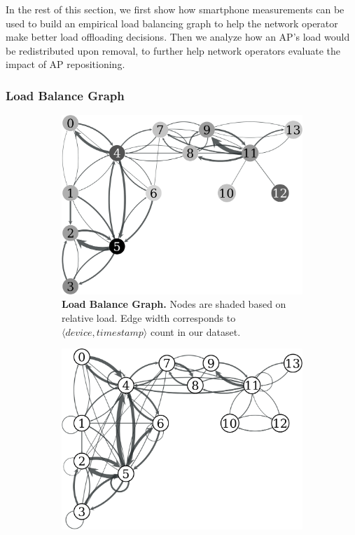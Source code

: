 In the rest of this section, we first show how smartphone measurements can be
used to build an empirical load balancing graph to help the network operator
make better load offloading decisions. Then we analyze how an AP's load would be
redistributed upon removal, to further help network operators evaluate the
impact of AP repositioning.


\subsubsection{Load Balance Graph}
\label{subsec:load_balance}

\begin{figure}
  \centering
  \begin{subfigure}[b]{0.3\textwidth}
    \includegraphics[width=\columnwidth]{./figures/DavisLoadBalanceGraph.pdf}
    \caption{\textbf{Load Balance Graph.} Nodes are shaded based on 
      relative load. Edge width corresponds to $\langle device, timestamp \rangle$
    count in our dataset.}
    \label{fig:davis_load_balance}
  \end{subfigure}%
  \begin{subfigure}[b]{0.3\textwidth}
    \includegraphics[width=\columnwidth]{./figures/DavisLoadRedistributionGraph.pdf}

\end{subfigure}
\end{figure}
